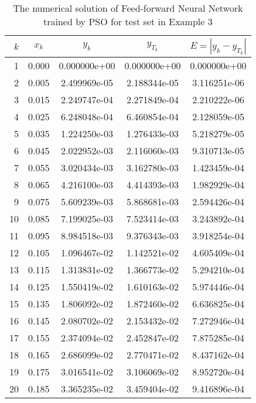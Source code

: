 \begin{table}[ht]
  \caption{The numerical solution of Feed-forward Neural Network trained by PSO for test set in Example 3}
  \centering
  \begin{tabular}{rcccc}
    $k$ & $x_{k}$ & $y_{k}$ & $y_{T_{k}}$ & $E=|y_{k} - y_{T_{k}}|$\\
    \hline\hline
     1 &  0.000 &    0.000000e+00 &    0.000000e+00  &     0.000000e+00\\ 
     2 &  0.005 &    2.499969e-05 &    2.188344e-05  &     3.116251e-06\\ 
     3 &  0.015 &    2.249747e-04 &    2.271849e-04  &     2.210222e-06\\ 
     4 &  0.025 &    6.248048e-04 &    6.460854e-04  &     2.128059e-05\\ 
     5 &  0.035 &    1.224250e-03 &    1.276433e-03  &     5.218279e-05\\ 
     6 &  0.045 &    2.022952e-03 &    2.116060e-03  &     9.310713e-05\\ 
     7 &  0.055 &    3.020434e-03 &    3.162780e-03  &     1.423459e-04\\ 
     8 &  0.065 &    4.216100e-03 &    4.414393e-03  &     1.982929e-04\\ 
     9 &  0.075 &    5.609239e-03 &    5.868681e-03  &     2.594426e-04\\ 
    10 &  0.085 &    7.199025e-03 &    7.523414e-03  &     3.243892e-04\\ 
    11 &  0.095 &    8.984518e-03 &    9.376343e-03  &     3.918254e-04\\ 
    12 &  0.105 &    1.096467e-02 &    1.142521e-02  &     4.605409e-04\\ 
    13 &  0.115 &    1.313831e-02 &    1.366773e-02  &     5.294210e-04\\ 
    14 &  0.125 &    1.550419e-02 &    1.610163e-02  &     5.974446e-04\\ 
    15 &  0.135 &    1.806092e-02 &    1.872460e-02  &     6.636825e-04\\ 
    16 &  0.145 &    2.080702e-02 &    2.153432e-02  &     7.272946e-04\\ 
    17 &  0.155 &    2.374094e-02 &    2.452847e-02  &     7.875285e-04\\ 
    18 &  0.165 &    2.686099e-02 &    2.770471e-02  &     8.437162e-04\\ 
    19 &  0.175 &    3.016541e-02 &    3.106069e-02  &     8.952720e-04\\ 
    20 &  0.185 &    3.365235e-02 &    3.459404e-02  &     9.416896e-04\\ 

\end{tabular}
\end{table}
